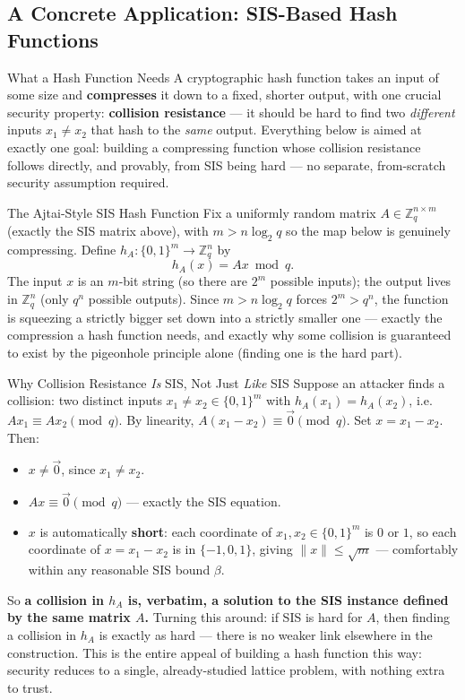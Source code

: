 \subsection{A Concrete Application: SIS-Based Hash Functions}
\label{sec:L2:a-concrete-application-sis-based-hash-fu}

\begin{rmkbox}{What a Hash Function Needs}
A cryptographic hash function takes an input of some size and \textbf{compresses} it down to a fixed, shorter output, with one crucial security property: \textbf{collision resistance} --- it should be hard to find two \emph{different} inputs $x_1 \ne x_2$ that hash to the \emph{same} output. Everything below is aimed at exactly one goal: building a compressing function whose collision resistance follows directly, and provably, from SIS being hard --- no separate, from-scratch security assumption required.
\end{rmkbox}

\begin{defbox}{The Ajtai-Style SIS Hash Function}
Fix a uniformly random matrix $A \in \mathbb{Z}_q^{n \times m}$ (exactly the SIS matrix above), with $m > n\log_2 q$ so the map below is genuinely compressing. Define $h_A : \{0,1\}^m \to \mathbb{Z}_q^n$ by
$$
h_A(x) = Ax \bmod q.
$$
The input $x$ is an $m$-bit string (so there are $2^m$ possible inputs); the output lives in $\mathbb{Z}_q^n$ (only $q^n$ possible outputs). Since $m > n \log_2 q$ forces $2^m > q^n$, the function is squeezing a strictly bigger set down into a strictly smaller one --- exactly the compression a hash function needs, and exactly why some collision is guaranteed to exist by the pigeonhole principle alone (finding one is the hard part).
\end{defbox}

\begin{rmkbox}{Why Collision Resistance \emph{Is} SIS, Not Just \emph{Like} SIS}
Suppose an attacker finds a collision: two distinct inputs $x_1 \ne x_2 \in \{0,1\}^m$ with $h_A(x_1) = h_A(x_2)$, i.e.\ $Ax_1 \equiv Ax_2 \pmod q$. By linearity, $A(x_1 - x_2) \equiv \vec 0 \pmod q$. Set $x = x_1 - x_2$. Then:
\begin{itemize}[leftmargin=*]
  \item $x \ne \vec 0$, since $x_1 \ne x_2$.
  \item $A x \equiv \vec 0 \pmod q$ --- exactly the SIS equation.
  \item $x$ is automatically \textbf{short}: each coordinate of $x_1, x_2 \in \{0,1\}^m$ is $0$ or $1$, so each coordinate of $x = x_1-x_2$ is in $\{-1,0,1\}$, giving $\|x\| \le \sqrt{m}$ --- comfortably within any reasonable SIS bound $\beta$.
\end{itemize}
So \textbf{a collision in $h_A$ is, verbatim, a solution to the SIS instance defined by the same matrix $A$.} Turning this around: if SIS is hard for $A$, then finding a collision in $h_A$ is exactly as hard --- there is no weaker link elsewhere in the construction. This is the entire appeal of building a hash function this way: security reduces to a single, already-studied lattice problem, with nothing extra to trust.
\end{rmkbox}

